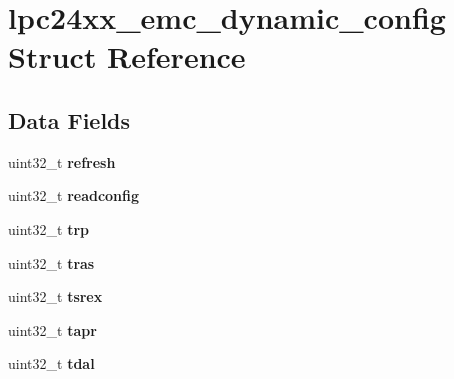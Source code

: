 \hypertarget{structlpc24xx__emc__dynamic__config}{}\section{lpc24xx\+\_\+emc\+\_\+dynamic\+\_\+config Struct Reference}
\label{structlpc24xx__emc__dynamic__config}
\subsection*{Data Fields}
\begin{DoxyCompactItemize}
\item 
\mbox{\label{structlpc24xx__emc__dynamic__config_ac0a2435680425f12f276b2b124d39cd2}} 
uint32\+\_\+t {\bfseries refresh}
\item 
\mbox{\label{structlpc24xx__emc__dynamic__config_a1dddc43a2de3e97a1caf246cfef7eaf2}} 
uint32\+\_\+t {\bfseries readconfig}
\item 
\mbox{\label{structlpc24xx__emc__dynamic__config_a4f9344309aeeeccf25f652c4aa8af2fb}} 
uint32\+\_\+t {\bfseries trp}
\item 
\mbox{\label{structlpc24xx__emc__dynamic__config_af361fd2a7e6382d61bba1ecfee69a45d}} 
uint32\+\_\+t {\bfseries tras}
\item 
\mbox{\label{structlpc24xx__emc__dynamic__config_ae7bf3c98f6075e6cc8fe63b535cb08d0}} 
uint32\+\_\+t {\bfseries tsrex}
\item 
\mbox{\label{structlpc24xx__emc__dynamic__config_a779ddc26a6a453134c2a253aa30d0f10}} 
uint32\+\_\+t {\bfseries tapr}
\item 
\mbox{\label{structlpc24xx__emc__dynamic__config_a47d6a90c54da00a6dbbdd01243894317}} 
uint32\+\_\+t {\bfseries tdal}
\item 
\mbox{\label{structlpc24xx__emc__dynamic__config_a6e1c02aeb33d0c8771c4ba6ebe850458}} 

\end{DoxyCompactItemize}
